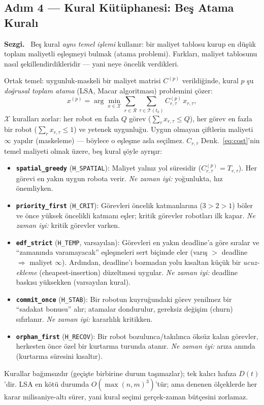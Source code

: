 \documentclass[11pt,a4paper]{article}
\newenvironment{sezgi}
  {\begin{lrbox}{\sezgibox}%
   \begin{minipage}{\dimexpr\linewidth-2\fboxsep-2\fboxrule\relax}%
   \small\textbf{\color{blue!55!black}Sezgi.}~}
  {\end{minipage}\end{lrbox}%
   \par\smallskip\noindent
   \fcolorbox{blue!45!black}{blue!5}{\usebox{\sezgibox}}%
   \par\smallskip}
\newcommand{\R}{\mathcal{R}}
\newcommand{\T}{\mathcal{T}}
\newcommand{\Hspatial}{\texttt{H\_SPATIAL}}
\newcommand{\Hcrit}{\texttt{H\_CRIT}}
\newcommand{\Htemp}{\texttt{H\_TEMP}}
\newcommand{\Hstab}{\texttt{H\_STAB}}
\newcommand{\Hrecov}{\texttt{H\_RECOV}}
\begin{document}
\subsection{Adım 4 --- Kural Kütüphanesi: Beş Atama Kuralı}
\label{sec:paradigms}

\begin{sezgi}
Beş kural \emph{aynı temel işlemi} kullanır: bir maliyet tablosu kurup en
düşük toplam maliyetli eşleşmeyi bulmak (atama problemi). Farkları, maliyet
tablosunu nasıl şekillendirdikleridir --- yani neye öncelik verdikleri.
\end{sezgi}

Ortak temel: uygunluk-maskeli bir maliyet matrisi $C^{(p)}$ verildiğinde,
kural $p$ şu \emph{doğrusal toplam atama} (LSA, Macar algoritması) problemini
çözer:
\begin{equation}
  x^{(p)} = \arg\min_{x\in\mathcal{X}}
            \sum_{r\in\R}\sum_{\tau\in\T(t_k)} C^{(p)}_{r,\tau}\,x_{r,\tau},
  \label{eq:lsa}
\end{equation}
$\mathcal{X}$ kuralları zorlar: her robot en fazla $Q$ görev
($\sum_\tau x_{r,\tau}\le Q$), her görev en fazla bir robot
($\sum_r x_{r,\tau}\le 1$) ve yetenek uygunluğu. Uygun olmayan çiftlerin
maliyeti $\infty$ yapılır (maskeleme) --- böylece o eşleşme asla seçilmez.
$C_{r,\tau}$ Denk.~\eqref{eq:cost}'nin temel maliyeti olmak üzere, beş kural
şöyle ayrışır:
\begin{itemize}
  \item \textbf{\texttt{spatial\_greedy}} (\Hspatial): Maliyet yalnız yol
        süresidir ($C^{(p)}_{r,\tau}=T_{r,\tau}$). Her görevi en yakın uygun
        robota verir. \emph{Ne zaman iyi:} yoğunlukta, hız önemliyken.
  \item \textbf{\texttt{priority\_first}} (\Hcrit): Görevleri öncelik
        katmanlarına ($3>2>1$) böler ve önce yüksek öncelikli katmanı eşler;
        kritik görevler robotları ilk kapar. \emph{Ne zaman iyi:} kritik
        görevler varken.
  \item \textbf{\texttt{edf\_strict}} (\Htemp, varsayılan): Görevleri en yakın
        deadline'a göre sıralar ve ``zamanında varamayacak'' eşleşmeleri sert
        biçimde eler (varış $>$ deadline $\Rightarrow$ maliyet $\infty$).
        Ardından, deadline'ı bozmadan yolu kısaltan küçük bir
        \emph{ucuz-ekleme} (cheapest-insertion) düzeltmesi uygular. \emph{Ne
        zaman iyi:} deadline baskısı yüksekken (varsayılan kural).
  \item \textbf{\texttt{commit\_once}} (\Hstab): Bir robotun kuyruğundaki görev
        yenilmez bir ``sadakat bonusu'' alır; atamalar dondurulur, gereksiz
        değişim (churn) sıfırlanır. \emph{Ne zaman iyi:} kararlılık kritikken.
  \item \textbf{\texttt{orphan\_first}} (\Hrecov): Bir robot bozulunca/takılınca
        öksüz kalan görevler, herkesten önce özel bir kurtarma turunda atanır.
        \emph{Ne zaman iyi:} arıza anında (kurtarma süresini kısaltır).
\end{itemize}
Kurallar bağımsızdır (geçişte birbirine durum taşımazlar); tek kalıcı hafıza
$D(t)$'dir. LSA en kötü durumda $O(\max(n,m)^3)$'tür; ama denenen ölçeklerde
her karar milisaniye-altı sürer, yani kural seçimi gerçek-zaman bütçesini
zorlamaz.
\end{document}

